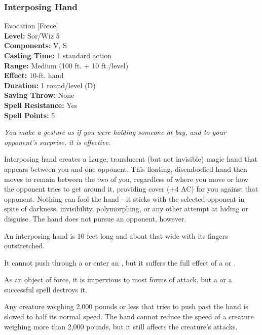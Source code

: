 \subsubsection{Interposing Hand}
\label{Spell:InterposingHand}
Evocation [Force]
\\ \textbf{Level:} Sor/Wiz 5
\\ \textbf{Components:} V, S
\\ \textbf{Casting Time:} 1 standard action
\\ \textbf{Range:} Medium (100 ft. + 10 ft./level)
\\ \textbf{Effect:} 10-ft. hand
\\ \textbf{Duration:} 1 round/level (D)
\\ \textbf{Saving Throw:} None
\\ \textbf{Spell Resistance:} Yes
\\ \textbf{Spell Points:} 5

\emph{You make a gesture as if you were holding someone at bay, and to your opponent's surprise, it is effective.}

Interposing hand creates a Large, translucent (but not invisible) magic hand that appears between you and one opponent. 
This floating, disembodied hand then moves to remain between the two of you, 
regardless of where you move or how the opponent tries to get around it, providing cover (+4 AC) for you against that opponent. 
Nothing can fool the hand - it sticks with the selected opponent in spite of darkness, invisibility, polymorphing, or any other attempt at hiding or disguise. 
The hand does not pursue an opponent, however.

An interposing hand is 10 feet long and about that wide with its fingers outstretched. 
% 

It cannot push through a  or enter an , 
but it suffers the full effect of a  or . %

As an object of force, it is impervious to most forms of attack, but a  or a successful  spell destroys it.

Any creature weighing 2,000 pounds or less that tries to push past the hand is slowed to half its normal speed. 
The hand cannot reduce the speed of a creature weighing more than 2,000 pounds, but it still affects the creature's attacks.


